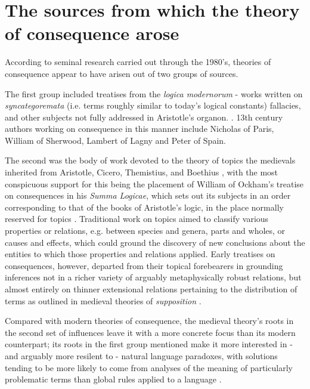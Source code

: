 \documentclass[]{article}
\begin{document}
\section{The sources from which the theory of consequence arose}
According to seminal research carried out through the 1980's,
theories of consequence appear to have arisen out of two groups of sources. 

The first group 
included treatises 
from the \emph{logica modernorum} 
- 
works written on 
\emph{syncategoremata} (i.e. terms roughly similar to today's logical constants) 
fallacies,
and other subjects not fully addressed in Aristotle's organon. 
\autocite{Green-Pedersen1984,Spruyt2018}.
13th century authors working on consequence in this manner include 
Nicholas of Paris, 
William of Sherwood, 
Lambert of Lagny 
and Peter of Spain.

The second was the body of work devoted to the theory of topics the medievals inherited from Aristotle, 
Cicero, 
Themistius, 
and Boethius \autocite{Stump1982}, 
with the most conspicuous support for this being the placement of William of Ockham's treatise on consequences in his \emph{Summa Logicae}, 
which sets out its subjects in an order corresponding to that of the books of Aristotle's logic, 
in the place normally reserved for topics \autocite{OckhamSL}. 
Traditional work on topics aimed to classify various properties or relations, 
e.g. between species and genera, 
parts and wholes, 
or causes and effects, 
which could ground the discovery of new conclusions about the entities to which those properties and relations applied. 
Early treatises on consequences, 
however, 
departed from their topical forebearers in 
grounding inferences not in a richer variety of arguably metaphysically robust relations, but almost entirely on thinner extensional relations pertaining to the distribution of terms as outlined in medieval theories of \emph{supposition} \autocite{HodgesBurley,sep-medieval-terms,Archambault2022}. 

Compared with modern theories of consequence, 
the medieval theory's roots 
in the second set of influences leave it with a more concrete focus than its modern counterpart;
its roots 
in the first group mentioned 
make it more interested in 
- and arguably more resilent to - 
natural language paradoxes, 
with solutions tending to be more likely to come from analyses of the meaning of particularly problematic terms than global rules applied to a language \autocite{Klima2004,Klima2016}. 
\end{document}
